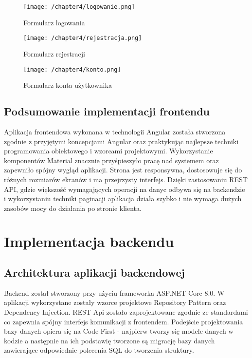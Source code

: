 \begin{figure}[!htb]
	\centering
	\texttt{[image: /chapter4/logowanie.png]}
	\caption{Formularz logowania}
	\label{figlogowanie}
\end{figure}

\begin{figure}[!htb]
	\centering
	\texttt{[image: /chapter4/rejestracja.png]}
	\caption{Formularz rejestracji}
	\label{fig:rejestracja}
\end{figure}

\begin{figure}[!htb]
	\centering
	\texttt{[image: /chapter4/konto.png]}
	\caption{Formularz konta użytkownika}
	\label{fig:konto}
\end{figure}

\subsection{Podsumowanie implementacji frontendu}

Aplikacja frontendowa wykonana w technologii Angular została stworzona zgodnie z przyjętymi koncepcjami Angular oraz praktykując najlepsze techniki programowania obiektowego i wzorcami projektowymi. Wykorzystanie komponentów Material znacznie przyśpieszyło pracę nad systemem oraz zapewniło spójny wygląd aplikacji. Strona jest responsywna, dostosowuje się do różnych rozmiarów ekranów i ma przejrzysty interfejs. Dzięki zastosowaniu REST API, gdzie większość wymagających operacji na danyc odbywa się na backendzie i wykorzystaniu techniki paginacji aplikacja działa szybko i nie wymaga dużych zasobów mocy do działania po stronie klienta.

\FloatBarrier

\section{Implementacja backendu}

\subsection{Architektura aplikacji backendowej}
Backend został stworzony przy użyciu frameworka ASP.NET Core 8.0. W aplikacji wykorzystane zostały wzorce projektowe Repository Pattern oraz Dependency Injection. REST Api zostało zaprojektowane zgodnie ze standardami co zapewnia spójny interfejs komunikacji z frontendem. Podejście projektowania bazy danych opiera się na Code First - najpierw tworzy się modele danych w kodzie a następnie na ich podstawię tworzone są migrację bazy danych zawierające odpowiednie polecenia SQL do tworzenia struktury.

